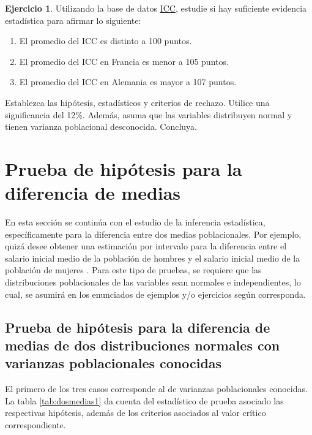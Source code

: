 \documentclass[
  11pt,
]{book}
\providecommand{\tightlist}{%
  \setlength{\itemsep}{0pt}\setlength{\parskip}{0pt}}
\theoremstyle{definition}
\theoremstyle{definition}
\theoremstyle{definition}
\newtheorem{exercise}{Ejercicio}[chapter]
\theoremstyle{definition}
\theoremstyle{remark}
\begin{document}
\begin{exercise}
\protect\hypertarget{exr:consumidor}{}\label{exr:consumidor}Utilizando la base de datos \hyperref[ICC]{ICC}, estudie si hay suficiente evidencia estadística para afirmar lo siguiente:

\begin{enumerate}
\def\labelenumi{\arabic{enumi}.}
\tightlist
\item
  El promedio del ICC es distinto a 100 puntos.
\item
  El promedio del ICC en Francia es menor a 105 puntos.
\item
  El promedio del ICC en Alemania es mayor a 107 puntos.
\end{enumerate}

Establezca las hipótesis, estadísticos y criterios de rechazo. Utilice una significancia del 12\%. Además, asuma que las variables distribuyen normal y tienen varianza poblacional desconocida. Concluya.
\end{exercise}

\section{Prueba de hipótesis para la diferencia de medias}\label{prueba-de-hipuxf3tesis-para-la-diferencia-de-medias}

En esta sección se continúa con el estudio de la inferencia estadística, específicamente para la diferencia entre dos medias poblacionales. Por ejemplo, quizá desee obtener una estimación por intervalo para la diferencia entre el salario inicial medio de la población de hombres y el salario inicial medio de la población de mujeres \citep[página 395]{anderson}. Para este tipo de pruebas, se requiere que las distribuciones poblacionales de las variables sean normales e independientes, lo cual, se asumirá en los enunciados de ejemplos y/o ejercicios según corresponda.

\subsection{Prueba de hipótesis para la diferencia de medias de dos distribuciones normales con varianzas poblacionales conocidas}\label{prueba-de-hipuxf3tesis-para-la-diferencia-de-medias-de-dos-distribuciones-normales-con-varianzas-poblacionales-conocidas}

El primero de los tres casos corresponde al de varianzas poblacionales conocidas. La tabla \ref{tab:dosmedias1} da cuenta del estadístico de prueba asociado las respectivas hipótesis, además de los criterios asociados al valor crítico correspondiente.
\end{document}
